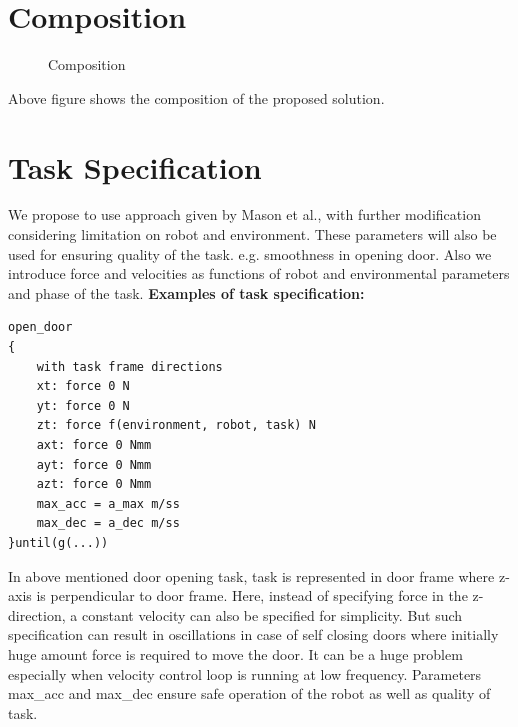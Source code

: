\documentclass[thesis]{mas_proposal}
\begin{document}
\section{Composition}

\begin{figure}[!h]
	\caption{\label{fig:composition} Composition}
\end{figure}
Above figure shows the composition of the proposed solution.

\section{Task Specification}
We propose to use approach given by Mason et al.\cite{mason1981compliance}, with further modification considering limitation on robot and environment. These parameters will also be used for ensuring quality of the task. e.g. smoothness in opening door. Also we introduce force and velocities as functions of robot and environmental parameters and phase of the task. 
\newpage
\textbf{Examples of task specification:} 
\begin{lstlisting}[label=open_door_ts,caption=Task specification for opening door]
open_door
{
	with task frame directions
	xt: force 0 N
	yt: force 0 N
	zt: force f(environment, robot, task) N
	axt: force 0 Nmm
	ayt: force 0 Nmm
	azt: force 0 Nmm
	max_acc = a_max m/ss
	max_dec = a_dec m/ss
}until(g(...))

\end{lstlisting}

In above mentioned door opening task, task is represented in door frame where z-axis is perpendicular to door frame. Here, instead of specifying force in the z-direction, a constant velocity can also be specified for simplicity. But such specification can result in oscillations in case of self closing doors where initially huge amount force is required to move the door. It can be a huge problem especially when velocity control loop is running at low frequency. Parameters max\_acc and max\_dec ensure safe operation of the robot as well as quality of task.
\end{document}
